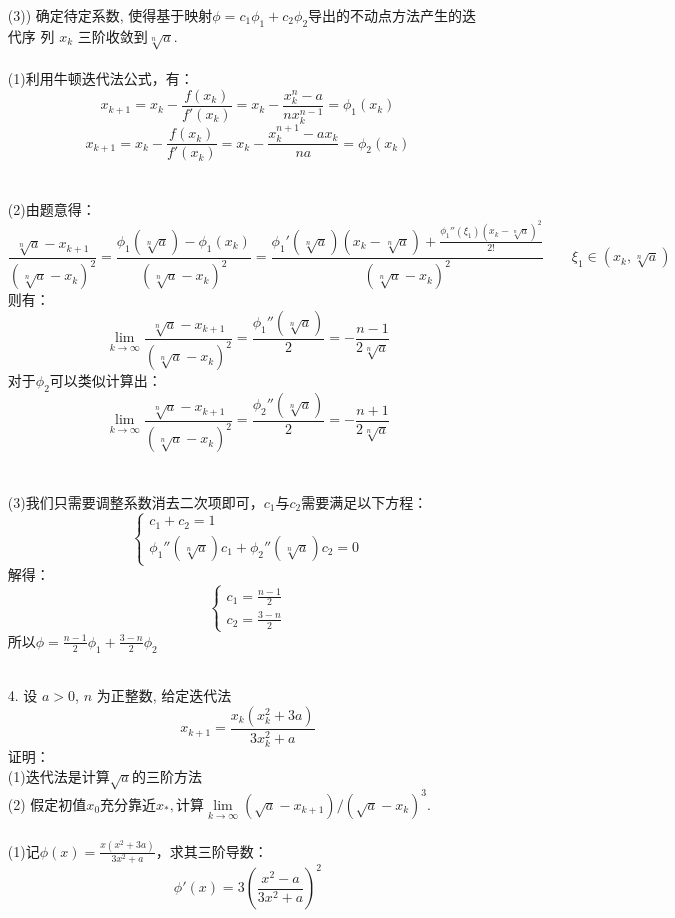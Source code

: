 \documentclass{article}
\begin{document}
\begin{itemize}
		(3)) 确定待定系数, 使得基于映射$\phi = c_1\phi_1 + c_2\phi_2 $导出的不动点方法产生的迭代序
		列 ${x_k}$ 三阶收敛到$\sqrt[n]{a}$.\\
		\\
		(1)利用牛顿迭代法公式，有：
		$$x_{k+1} = x_{k} - \frac{f(x_k)}{f'(x_k)} = x_k - \frac{x_{k}^n - a}{nx_k^{n - 1}} = \phi_{1}(x_k)$$
		$$x_{k+1} = x_{k} - \frac{f(x_k)}{f'(x_k)} = x_k - \frac{x_{k}^{n+1} - ax_k}{na} = \phi_{2}(x_k)$$\\
		\\
		(2)由题意得：
		$$\frac{\sqrt[n]{a} - x_{k+1}}{(\sqrt[n]{a} - x_{k})^2} = \frac{\phi_1(\sqrt[n]{a}) -\phi_{1}( x_{k})}{(\sqrt[n]{a} - x_{k})^2} =  \frac{\phi_{1}'(\sqrt[n]{a})(x_k  -\sqrt[n]{a}) + \frac{\phi_{1}''(\xi_1)(x_k  -\sqrt[n]{a})^2}{2!}}{(\sqrt[n]{a} - x_{k})^2} \qquad \xi_1 \in (x_k,\sqrt[n]{a})$$
		则有：
		$$
			\lim\limits_{k \rightarrow \infty}\frac{\sqrt[n]{a} - x_{k+1}}{(\sqrt[n]{a} - x_{k})^2} =\frac{\phi_{1}''(\sqrt[n]{a})}{2} = - \frac{n - 1}{2\sqrt[n]{a}}
		$$
		对于$\phi_{2}$可以类似计算出：
				$$
		\lim\limits_{k \rightarrow \infty}\frac{\sqrt[n]{a} - x_{k+1}}{(\sqrt[n]{a} - x_{k})^2} =\frac{\phi_{2}''(\sqrt[n]{a})}{2} = -\frac{n+1}{2\sqrt[n]{a}}
		$$\\
		\\
		(3)我们只需要调整系数消去二次项即可，$c_1$与$c_2$需要满足以下方程：
		$$
			\left\{
				\begin{array}{lcl}
				c_1 + c_2 = 1 \\
				\phi_{1}''(\sqrt[n]{a})c_1 + \phi_{2}''(\sqrt[n]{a})c_2 = 0
				\end{array}
			\right.
		$$
		解得：
			$$
		\left\{
		\begin{array}{lcl}
		c_1 = \frac{n - 1}{2}\\
		c_2 = \frac{3 - n}{2}
		\end{array}
		\right.
		$$
		所以$\phi =\frac{n - 1}{2}\phi_1 + \frac{3 - n}{2}\phi_2$\\\\
		\item[4.]设 $a > 0 $, $n$ 为正整数, 给定迭代法
		$$
		x_{k+1} = \frac{x_k(x_k^2 + 3a)}{3x_k^2 + a}
		$$
		证明：\\
		(1)迭代法是计算$\sqrt{a}$的三阶方法\\
		(2) 假定初值$x_0$充分靠近$x_*,$计算$\lim\limits_{k\rightarrow \infty}(\sqrt{a} - x_{k+1})/(\sqrt{a} - x_k)^3.$ \\
		\\
		(1)记$\phi(x) = \frac{x(x^2 + 3a)}{3x^2 + a}$，求其三阶导数：
		$$\phi'(x) = 3\left(\frac{x^2 - a}{3x^2 + a}\right)^2$$

\end{itemize}
\end{document}
